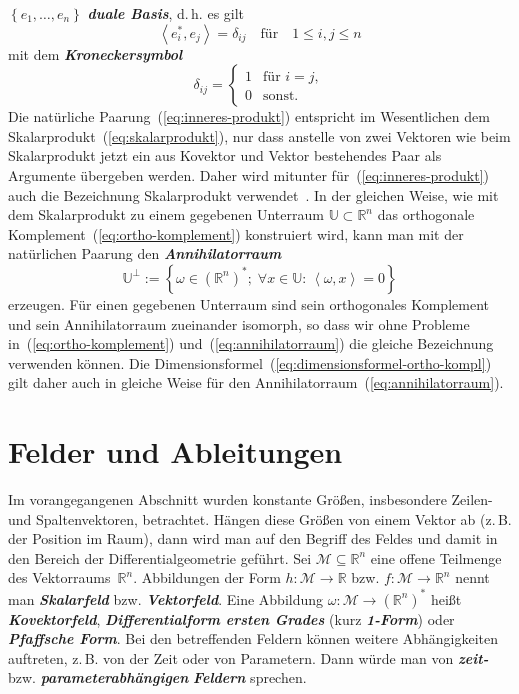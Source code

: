$\left\{ e_{1},\ldots,e_{n}\right\} $ \textbf{\em duale Basis}, d.\,h.
es gilt
\[
\left\langle e_{i}^{*},e_{j}\right\rangle =\delta_{ij}\quad\textrm{für}\quad1\leq i,j\leq n
\]
mit dem \textbf{\em Kroneckersymbol}
\[
\delta_{ij}=\left\{ \begin{array}{cl}
1 & \textrm{für }i=j,\\
0 & \textrm{sonst.}
\end{array}\right.
\]
Die natürliche Paarung~(\ref{eq:inneres-produkt}) entspricht im
Wesentlichen dem Skalarprodukt~(\ref{eq:skalarprodukt}), nur dass
anstelle von zwei Vektoren wie beim Skalarprodukt jetzt ein aus Kovektor
und Vektor bestehendes Paar als Argumente übergeben werden. Daher
wird mitunter für~(\ref{eq:inneres-produkt}) auch die Bezeichnung
Skalarprodukt verwendet~\cite{bishop1980}.
In der gleichen Weise,
wie mit dem Skalarprodukt zu einem gegebenen Unterraum $\mathbb{U}\subset{\mathbb{R}}^{n}$
das orthogonale Komplement~(\ref{eq:ortho-komplement}) konstruiert
wird, kann man mit der natürlichen Paarung den \textbf{\em Annihilatorraum}
\begin{equation}
\mathbb{U}^{\perp}:=\left\{ \omega\in({\mathbb{R}}^{n})^{*};\;\forall x\in\mathbb{U}:\,\left\langle \omega,x\right\rangle =0\right\} \label{eq:annihilatorraum}
\end{equation}
erzeugen.
Für einen gegebenen Unterraum sind sein orthogonales Komplement
und sein Annihilatorraum zueinander isomorph, so dass wir ohne Probleme
in~(\ref{eq:ortho-komplement}) und~(\ref{eq:annihilatorraum})
die gleiche Bezeichnung verwenden können. Die Dimensionsformel~(\ref{eq:dimensionsformel-ortho-kompl})
gilt daher auch in gleiche Weise für den Annihilatorraum~(\ref{eq:annihilatorraum}).
\section{Felder und Ableitungen\label{sec:Felder-und-Ableitungen}}
Im vorangegangenen Abschnitt wurden konstante Größen, insbesondere
Zeilen- und Spaltenvektoren, betrachtet. Hängen diese Größen von einem
Vektor ab (z.\,B. der Position im Raum), dann wird man auf den Begriff
des Feldes und damit in den Bereich der Differentialgeometrie geführt.
Sei $\mathcal{M}\subseteq{\mathbb{R}}^{n}$ eine offene Teilmenge des Vektorraums~${\mathbb{R}}^{n}$.
Abbildungen der Form $h:\mathcal{M}\to{\mathbb{R}}$ bzw. $f:\mathcal{M}\to{\mathbb{R}}^{n}$
nennt man \textbf{\em Skalarfeld} bzw. \textbf{\em Vektorfeld}.
Eine Abbildung $\omega:\mathcal{M}\to({\mathbb{R}}^{n})^{*}$ heißt \textbf{\em Kovektorfeld},
\textbf{\em Differentialform ersten Grades}
(kurz \textbf{\em 1-Form}) oder \textbf{\em Pfaffsche Form}.
Bei den betreffenden
Feldern können weitere Abhängigkeiten auftreten, z.\,B. von der Zeit
oder von Parametern. Dann würde man von \textbf{\em zeit-} bzw. \textbf{\em parameterabhängigen}
\textbf{\em Feldern} sprechen.

